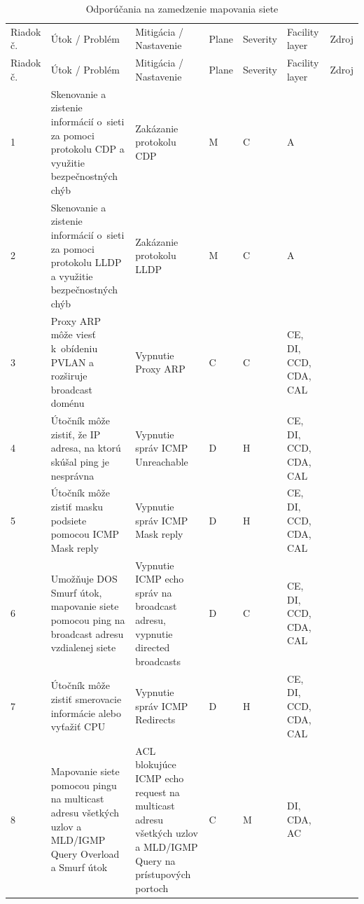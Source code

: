 \begin{longtable}[!htbp]{|C{2.5em}L{11em}L{11em}C{2.5em}C{4em}C{5em}L{2.5em}|}
	\caption{Odporúčania na zamedzenie mapovania siete}
	\label{tab:mapping}\\ \hline
	\mbox{Riadok} č.&Útok / Problém	&Mitigácia / Nastavenie	&Plane	&Severity	&Facility layer	&Zdroj\\ \hhline{=======}
	\endfirsthead 
	\hline
	\centering
	
	Riadok č.	&Útok / Problém	&Mitigácia / Nastavenie	&Plane	&Severity	&Facility layer	&Zdroj\\ \hhline{=======}
	\endhead
	
	 1	&Skenovanie a zistenie informácií o~sieti za pomoci protokolu CDP a využitie bezpečnostných chýb	&Zakázanie protokolu CDP	&M	&C	&A	& \cite{CIS_DrTLsgXv24lxeIIM}
	
	\cite{Graesser2001}\\
	2	&Skenovanie a zistenie informácií o~sieti za pomoci protokolu LLDP a využitie bezpečnostných chýb	&Zakázanie protokolu LLDP	&M	&C	&A	& \cite{McMillan2018}\\
	 3	&Proxy ARP môže viesť k~obídeniu PVLAN a rozširuje broadcast doménu	&Vypnutie Proxy ARP	&C	&C	&CE,
	DI,
	CCD,
	CDA,
	CAL	& \cite{CIS_DrTLsgXv24lxeIIM}
	
	\cite{Graesser2001}\\
	4	&Útočník môže zistiť, že IP adresa, na ktorú skúšal ping je nesprávna	&Vypnutie správ ICMP Unreachable	&D	&H	&CE,
	DI,
	CCD,
	CDA,
	CAL	& \cite{Singh2018}
	\\
	 5	&Útočník môže zistiť masku podsiete pomocou ICMP Mask reply	&Vypnutie správ ICMP Mask reply	&D	&H	&CE,
	DI,
	CCD,
	CDA,
	CAL	& \cite{Akin2002}
	\\
	6	&Umožňuje DOS Smurf útok, mapovanie siete pomocou ping na broadcast adresu vzdialenej siete	&Vypnutie ICMP echo správ na broadcast adresu, vypnutie directed broadcasts	&D	&C	&CE,
	DI,
	CCD,
	CDA,
	CAL	& \cite{Graesser2001}
	
	\cite{Akin2002}
	\\
	 7	&Útočník môže zistiť smerovacie informácie alebo vyťažiť CPU	&Vypnutie správ ICMP Redirects	&D	&H	&CE,
	DI,
	CCD,
	CDA,
	CAL	& \cite{Singh2018}
	\\
	8	&Mapovanie siete pomocou pingu na multicast adresu všetkých uzlov a MLD/IGMP Query Overload a Smurf útok	& ACL blokujúce ICMP echo request na multicast adresu všetkých uzlov a MLD/IGMP Query na prístupových portoch	&C	&M	&DI,
	CDA,
	AC	&\cite{Podermanski532015}
	
	\cite{Rey2016}\\
	\hline
\end{longtable}%


